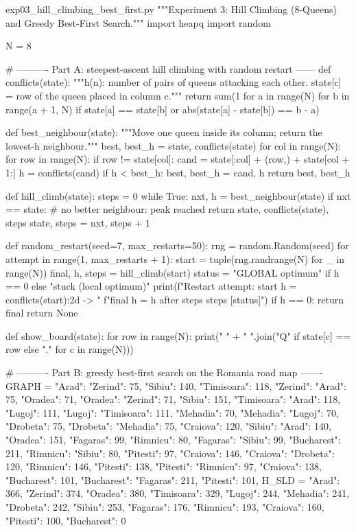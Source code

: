 \documentclass[11pt,a4paper]{article}
\begin{document}
\begin{pycode}{exp03\_hill\_climbing\_best\_first.py}
"""Experiment 3: Hill Climbing (8-Queens) and Greedy Best-First Search."""
import heapq
import random

N = 8


# ---------- Part A: steepest-ascent hill climbing with random restart ------
def conflicts(state):
    """h(n): number of pairs of queens attacking each other.
    state[c] = row of the queen placed in column c."""
    return sum(1 for a in range(N) for b in range(a + 1, N)
               if state[a] == state[b] or abs(state[a] - state[b]) == b - a)


def best_neighbour(state):
    """Move one queen inside its column; return the lowest-h neighbour."""
    best, best_h = state, conflicts(state)
    for col in range(N):
        for row in range(N):
            if row != state[col]:
                cand = state[:col] + (row,) + state[col + 1:]
                h = conflicts(cand)
                if h < best_h:
                    best, best_h = cand, h
    return best, best_h


def hill_climb(state):
    steps = 0
    while True:
        nxt, h = best_neighbour(state)
        if nxt == state:                 # no better neighbour: peak reached
            return state, conflicts(state), steps
        state, steps = nxt, steps + 1


def random_restart(seed=7, max_restarts=50):
    rng = random.Random(seed)
    for attempt in range(1, max_restarts + 1):
        start = tuple(rng.randrange(N) for _ in range(N))
        final, h, steps = hill_climb(start)
        status = "GLOBAL optimum" if h == 0 else "stuck (local optimum)"
        print(f"Restart {attempt}: start h = {conflicts(start):2d} -> "
              f"final h = {h} after {steps} steps  [{status}]")
        if h == 0:
            return final
    return None


def show_board(state):
    for row in range(N):
        print("   " + " ".join("Q" if state[c] == row else "." for c in range(N)))


# ---------- Part B: greedy best-first search on the Romania road map -------
GRAPH = {
    "Arad": {"Zerind": 75, "Sibiu": 140, "Timisoara": 118},
    "Zerind": {"Arad": 75, "Oradea": 71},
    "Oradea": {"Zerind": 71, "Sibiu": 151},
    "Timisoara": {"Arad": 118, "Lugoj": 111},
    "Lugoj": {"Timisoara": 111, "Mehadia": 70},
    "Mehadia": {"Lugoj": 70, "Drobeta": 75},
    "Drobeta": {"Mehadia": 75, "Craiova": 120},
    "Sibiu": {"Arad": 140, "Oradea": 151, "Fagaras": 99, "Rimnicu": 80},
    "Fagaras": {"Sibiu": 99, "Bucharest": 211},
    "Rimnicu": {"Sibiu": 80, "Pitesti": 97, "Craiova": 146},
    "Craiova": {"Drobeta": 120, "Rimnicu": 146, "Pitesti": 138},
    "Pitesti": {"Rimnicu": 97, "Craiova": 138, "Bucharest": 101},
    "Bucharest": {"Fagaras": 211, "Pitesti": 101},
}
H_SLD = {"Arad": 366, "Zerind": 374, "Oradea": 380, "Timisoara": 329,
         "Lugoj": 244, "Mehadia": 241, "Drobeta": 242, "Sibiu": 253,
         "Fagaras": 176, "Rimnicu": 193, "Craiova": 160, "Pitesti": 100,
         "Bucharest": 0}



\end{pycode}
\end{document}
